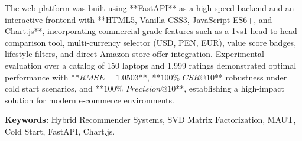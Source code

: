 The web platform was built using **FastAPI** as a high-speed backend and an interactive frontend with **HTML5, Vanilla CSS3, JavaScript ES6+, and Chart.js**, incorporating commercial-grade features such as a 1vs1 head-to-head comparison tool, multi-currency selector (USD, PEN, EUR), value score badges, lifestyle filters, and direct Amazon store offer integration. Experimental evaluation over a catalog of 150 laptops and 1,999 ratings demonstrated optimal performance with **$RMSE = 1.0503$**, **$100\%$ $CSR@10$** robustness under cold start scenarios, and **$100\%$ $Precision@10$**, establishing a high-impact solution for modern e-commerce environments.

\vspace{0.8cm}
\noindent \textbf{Keywords:} Hybrid Recommender Systems, SVD Matrix Factorization, MAUT, Cold Start, FastAPI, Chart.js.
